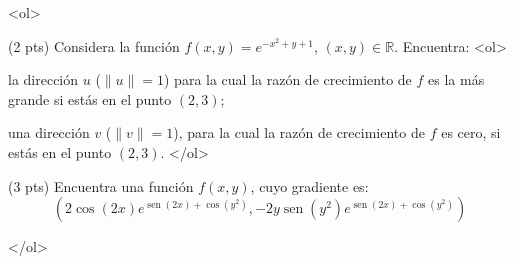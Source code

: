 \documentclass[12pt]{article}
\newcommand{\sen}{\operatorname{sen}}
\begin{document}
\bigskip

            
\bigskip
\bigskip
\bigskip


<ol>

  
\item (2 pts) Considera la función
  $f(x,y)=e^{-x^2+y+1}$, $(x,y)\in \mathbb{R}$. Encuentra:
  <ol>
    \item la dirección $u$ ($\|u\|=1$) para la cual
      la razón de crecimiento de $f$ es la más grande si estás
      en el punto $(2,3)$;
     \item una dirección $v$ ($\|v\|=1$), para la cual
       la razón de crecimiento de $f$ es cero, si estás en el punto
       $(2,3)$.
</ol>


  
\vspace{4cm}  


\item (3 pts) Encuentra una función $f(x,y)$, cuyo gradiente es:
  $$(2\cos(2x)e^{\sen(2x)+\cos(y^2)},-2y\sen(y^2)e^{\sen(2x)+\cos(y^2)})$$

</ol>


  
\end{document}
